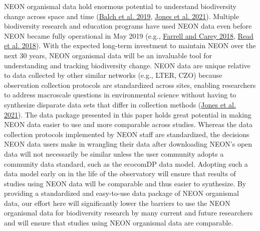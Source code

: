\documentclass[
  12pt,
]{article}
\begin{document}
NEON organismal data hold enormous potential to understand biodiversity change across space and time (\protect\hyperlink{ref-balch2019neon}{Balch et al. 2019}, \protect\hyperlink{ref-jones2021synergies}{Jones et al. 2021}). Multiple biodiversity research and education programs have used NEON data even before NEON became fully operational in May 2019 (e.g., \protect\hyperlink{ref-farrell2018power}{Farrell and Carey 2018}, \protect\hyperlink{ref-read2018among}{Read et al. 2018}). With the expected long-term investment to maintain NEON over the next 30 years, NEON organismal data will be an invaluable tool for understanding and tracking biodiversity change. NEON data are unique relative to data collected by other similar networks (e.g., LTER, CZO) because observation collection protocols are standardized across sites, enabling researchers to address macroscale questions in environmental science without having to synthesize disparate data sets that differ in collection methods (\protect\hyperlink{ref-jones2021synergies}{Jones et al. 2021}). The data package presented in this paper holds great potential in making NEON data easier to use and more comparable across studies. Whereas the data collection protocols implemented by NEON staff are standardized, the decisions NEON data users make in wrangling their data after downloading NEON's open data will not necessarily be similar unless the user community adopts a community data standard, such as the ecocomDP data model. Adopting such a data model early on in the life of the observatory will ensure that results of studies using NEON data will be comparable and thus easier to synthesize. By providing a standardized and easy-to-use data package of NEON organismal data, our effort here will significantly lower the barriers to use the NEON organismal data for biodiversity research by many current and future researchers and will ensure that studies using NEON organismal data are comparable.
\end{document}
